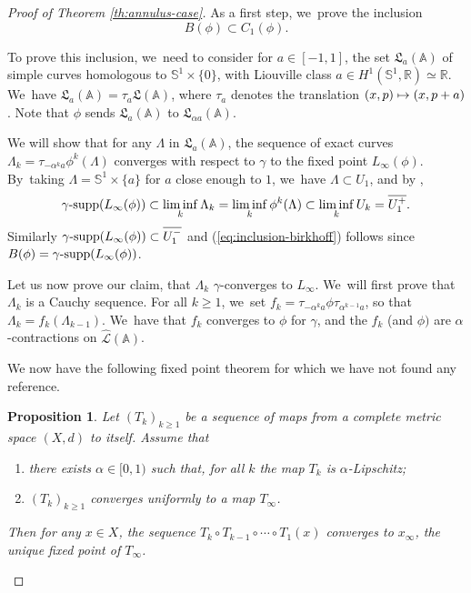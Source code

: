 \documentclass[10pt]{amsart}
\newcommand\mto{\mathchoice{\longmapsto}{\mapsto}{\mapsto}{\mapsto}}
\newtheorem{prop}[thm]{Proposition}
\theoremstyle{definition}
\DeclareMathOperator{\gammasupp}{\gamma\textup{-supp}}
\begin{document}
\begin{proof}[Proof of Theorem \ref{th:annulus-case}] As a first step, we~prove the inclusion
\begin{equation}
B(\phi) \subset C_{1}(\phi).\label{eq:inclusion-birkhoff}
\end{equation}

To prove this inclusion, we~need to consider for $a\in[-1,1]$, the set $\mathfrak{L}_a(\mathbb A)$ of simple curves homologous to $\mathbb S^1 \times \{0\}$, with Liouville class $a \in H^{1}(\mathbb S^{1}, {\mathbb R}) \simeq {\mathbb R} $. We~have $\mathfrak L_{a}(\mathbb A) =\tau_a\mathfrak L(\mathbb A)$, where $\tau_a$ denotes the translation $(x,p)\mto (x,p+a)$. Note that $\phi$ sends $\mathfrak L_{a}(\mathbb A)$ to $\mathfrak L_{\alpha a}(\mathbb A)$.

We will show that for any $\Lambda$ in $\mathfrak L_{a}(\mathbb A)$, the sequence of exact curves $\Lambda_k=\tau_{-\alpha^ka}\phi^k(\Lambda)$ converges with respect to $\gamma$ to the fixed point $L_\infty(\phi)$. By~taking $\Lambda=\mathbb S^1\times \{a\}$ for $a$ close enough to $1$, we~have $\Lambda\subset U_1$, and by \cite[Prop.\,6.17]{Viterbo-gammas},
\[
\gammasupp (L_{\infty}(\phi)) \subset \liminf_k\Lambda_k= \liminf_k\phi^k(\Lambda)\subset \liminf_k{U_k}=\overline{U_1^+}.
\]
Similarly $\gammasupp (L_{\infty}(\phi))\subset\overline{U_1^-}$ and (\ref{eq:inclusion-birkhoff}) follows since $B(\phi)=\gammasupp (L_{\infty}(\phi))$.

Let us now prove our claim, \ie that $\Lambda_k$ $\gamma$\nobreakdash-converges to $L_\infty$. We~will first prove that $\Lambda_k$ is a Cauchy sequence. For all $k\geq 1$, we~set $f_k=\tau_{-\alpha^ka} \phi \tau_{\alpha^{k-1}a}$, so that $\Lambda_{k}=f_k(\Lambda_{k-1})$. We~have that $f_{k}$ converges to $\phi$ for $\gamma$, and the $f_{k}$ (and $\phi)$ are $\alpha$\nobreakdash-contractions on $\widehat{\mathcal L} (\mathbb A)$.

We now have the following fixed point theorem for which we have not found any reference.

\begin{prop}
Let $(T_{k})_{k\geq 1}$ be a sequence of maps from a complete metric space $(X,d)$ to itself. Assume that
\begin{enumerate}
\item there exists $\alpha\in[0,1)$ such that, for all $k$ the map $T_{k}$ is $\alpha$-Lipschitz;
\item $(T_{k})_{k\geq 1}$ converges uniformly to a map $T_{\infty}$.
\end{enumerate}
Then for any $x\in X$, the sequence $T_{k}\circ T_{k-1}\circ \cdots \circ T_{1}(x)$ converges to $x_{\infty}$, the unique fixed point of $T_{\infty}$.
\end{prop}


\end{proof}
\end{document}
